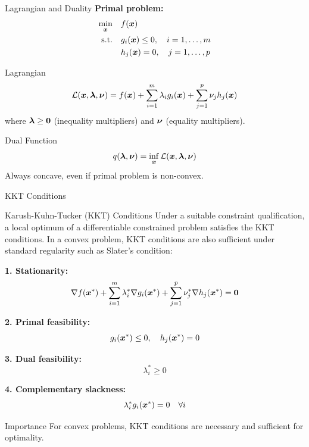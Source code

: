 \documentclass[aspectratio=169]{beamer}
\begin{document}
\begin{frame}{Lagrangian and Duality}
  \textbf{Primal problem:}
  \begin{align*}
    \min_{\boldsymbol{x}} \quad & f(\boldsymbol{x}) \\
    \text{s.t.} \quad & g_i(\boldsymbol{x}) \leq 0, \quad i = 1, \ldots, m \\
    & h_j(\boldsymbol{x}) = 0, \quad j = 1, \ldots, p
  \end{align*}

  \vspace{0.5em}

  \begin{definitionbox}{Lagrangian}
    $$\mathcal{L}(\boldsymbol{x}, \boldsymbol{\lambda}, \boldsymbol{\nu}) = f(\boldsymbol{x}) + \sum_{i=1}^m \lambda_i g_i(\boldsymbol{x}) + \sum_{j=1}^p \nu_j h_j(\boldsymbol{x})$$
    where $\boldsymbol{\lambda} \geq \boldsymbol{0}$ (inequality multipliers) and $\boldsymbol{\nu}$ (equality multipliers).
  \end{definitionbox}

  \vspace{0.5em}

  \begin{definitionbox}{Dual Function}
    $$q(\boldsymbol{\lambda}, \boldsymbol{\nu}) = \inf_{\boldsymbol{x}} \mathcal{L}(\boldsymbol{x}, \boldsymbol{\lambda}, \boldsymbol{\nu})$$
    Always concave, even if primal problem is non-convex.
  \end{definitionbox}
\end{frame}

\begin{frame}{KKT Conditions}
  \begin{theorembox}{Karush-Kuhn-Tucker (KKT) Conditions}
    Under a suitable constraint qualification, a local optimum of a differentiable constrained problem satisfies the KKT conditions. In a convex problem, KKT conditions are also sufficient under standard regularity such as Slater's condition:

    \textbf{1. Stationarity:}
    $$\nabla f(\boldsymbol{x}^*) + \sum_{i=1}^m \lambda_i^* \nabla g_i(\boldsymbol{x}^*) + \sum_{j=1}^p \nu_j^* \nabla h_j(\boldsymbol{x}^*) = \boldsymbol{0}$$

    \textbf{2. Primal feasibility:}
    $$g_i(\boldsymbol{x}^*) \leq 0, \quad h_j(\boldsymbol{x}^*) = 0$$

    \textbf{3. Dual feasibility:}
    $$\lambda_i^* \geq 0$$

    \textbf{4. Complementary slackness:}
    $$\lambda_i^* g_i(\boldsymbol{x}^*) = 0 \quad \forall i$$
  \end{theorembox}

  \vspace{0.5em}

  \begin{alertbox}{Importance}
    For convex problems, KKT conditions are necessary and sufficient for optimality.
  \end{alertbox}
\end{frame}
\end{document}

